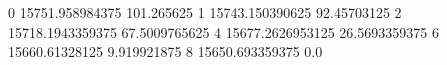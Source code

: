 0 15751.958984375 101.265625
1 15743.150390625 92.45703125
2 15718.1943359375 67.5009765625
4 15677.2626953125 26.5693359375
6 15660.61328125 9.919921875
8 15650.693359375 0.0
